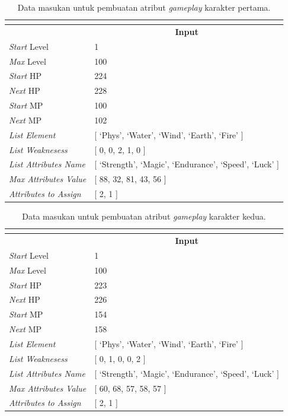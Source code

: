\begin{longtable}{|l|l|}
	\caption{Data masukan untuk pembuatan atribut \textit{gameplay} karakter pertama.}
	\vspace{1ex}
	\label{tb:player_input_variable_eval_1}\\
	\hline
	\rowcolor[HTML]{9B9B9B}
	\multicolumn{1}{|c|}{\cellcolor[HTML]{9B9B9B}\textbf{Variabel}} & \multicolumn{1}{c|}{\cellcolor[HTML]{9B9B9B}\textbf{Input}} \\ \hline
	\textit{Start} Level & 1 \\ \hline
	\textit{Max} Level & 100 \\ \hline
	\textit{Start} HP & 224 \\ \hline
	\textit{Next} HP & 228 \\ \hline
	\textit{Start} MP & 100 \\ \hline
	\textit{Next} MP & 102 \\ \hline
	\textit{List Element} & {[} `Phys', `Water', `Wind', `Earth', `Fire' {]} \\ \hline
	\textit{List Weaknesess} & {[} 0, 0, 2, 1, 0 {]} \\ \hline
	\textit{List Attributes Name} & {[} `Strength', `Magic', `Endurance', `Speed', `Luck' {]} \\ \hline
	\textit{Max Attributes Value} & {[} 88, 32, 81, 43, 56 {]} \\ \hline
	\textit{Attributes to Assign} & {[} 2, 1 {]} \\ \hline
\end{longtable}
\vspace{-2ex}

\begin{longtable}{|l|l|}
	\caption{Data masukan untuk pembuatan atribut \textit{gameplay} karakter kedua.}
	\vspace{1ex}
	\label{tb:player_input_variable_eval_2}\\
	\hline
	\rowcolor[HTML]{9B9B9B} 
	\multicolumn{1}{|c|}{\cellcolor[HTML]{9B9B9B}\textbf{Variabel}} & \multicolumn{1}{c|}{\cellcolor[HTML]{9B9B9B}\textbf{Input}} \\ \hline
	\textit{Start} Level & 1 \\ \hline
	\textit{Max} Level & 100 \\ \hline
	\textit{Start} HP & 223 \\ \hline
	\textit{Next} HP & 226 \\ \hline
	\textit{Start} MP & 154 \\ \hline
	\textit{Next} MP & 158 \\ \hline
	\textit{List Element} & {[} `Phys', `Water', `Wind', `Earth', `Fire' {]} \\ \hline
	\textit{List Weaknesess} & {[} 0, 1, 0, 0, 2 {]} \\ \hline
	\textit{List Attributes Name} & {[} `Strength', `Magic', `Endurance', `Speed', `Luck' {]} \\ \hline
	\textit{Max Attributes Value} & {[} 60, 68, 57, 58, 57 {]} \\ \hline
	\textit{Attributes to Assign} & {[} 2, 1 {]} \\ \hline
\end{longtable}
\vspace{1ex}

